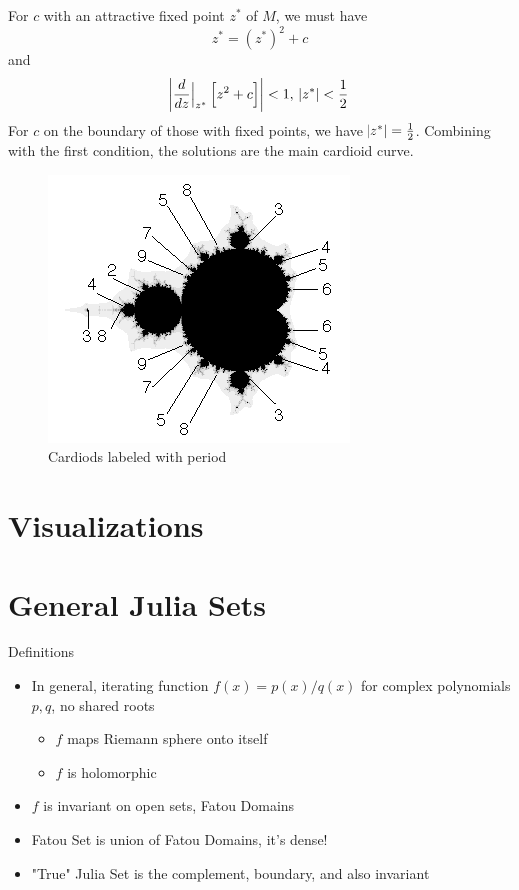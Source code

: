 \documentclass{article}
\begin{document}
For $c$ with an attractive fixed point $z^*$ of $M$, we must have
\[ z^* = (z^*)^2 + c \]
and
\[ \abs{\frac{d}{dz}\Bigr|_{z^*}\left[z^2 + c\right]} < 1,\ \abs{z^*} < \frac{1}{2} \]
For $c$ on the boundary of those with fixed points, we have $\abs{z^*} = \frac{1}{2}$. Combining with the first condition, the solutions are the main cardioid curve.



\begin{figure}[!htbp]
    \centering
    \includegraphics[width=.4\linewidth]{images/MandelMap1.png}
    \caption{Cardiods labeled with period \cite{MichaelFrame}} %
    \label{fig:MandelbrotCycles}
\end{figure}


\section{Visualizations}



\section{General Julia Sets}

Definitions
\begin{itemize}
    \item In general, iterating function $f(x) = p(x) / q(x)$ for complex polynomials $p, q$, no shared roots
    \begin{itemize}
        \item $f$ maps Riemann sphere onto itself
        \item $f$ is holomorphic
    \end{itemize}
    \item $f$ is invariant on open sets, Fatou Domains
    \item Fatou Set is union of Fatou Domains, it's dense!
    \item "True" Julia Set is the complement, boundary, and also invariant
\end{itemize}
\end{document}
